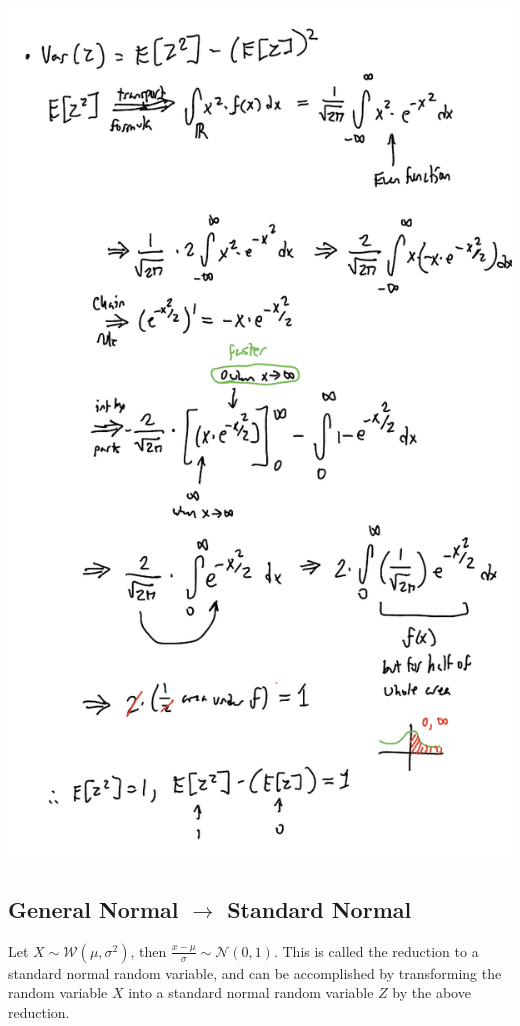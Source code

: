 \documentclass{article}
\begin{document}
\begin{center}
    \includegraphics[scale=0.25]{q1-3.jpeg}
\end{center}

\subsection{General Normal $\rightarrow$ Standard Normal}

Let $X \sim \mathcal{W}(\mu, \sigma^2)$, then $\frac{x-\mu}{\sigma} \sim \mathcal{N}(0,1)$. This is called the reduction to a standard normal random variable, and can be accomplished by transforming the random variable $X$ into a standard normal random variable $Z$ by the above reduction.
\end{document}
